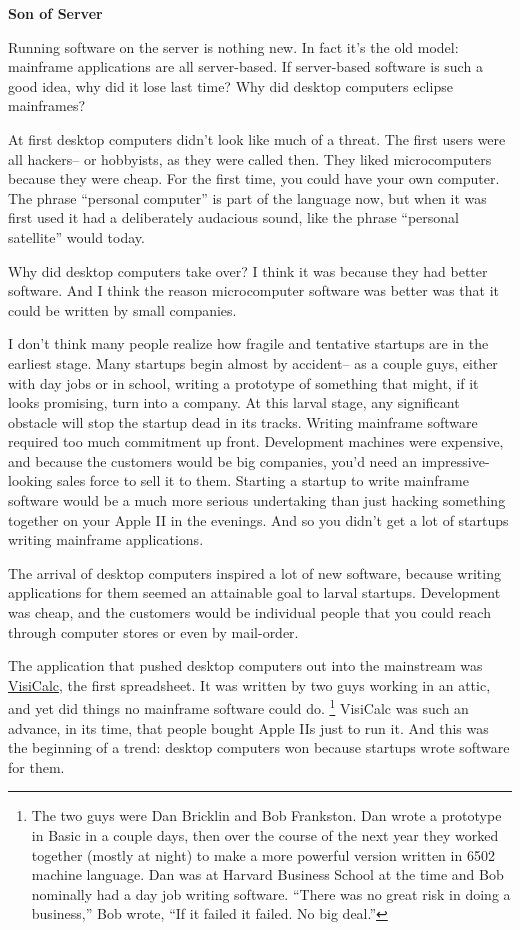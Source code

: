 \textbf{Son of Server}

Running software on the server is nothing new. In fact it's the old
model: mainframe applications are all server-based. If server-based
software is such a good idea, why did it lose last time? Why did desktop
computers eclipse mainframes?

At first desktop computers didn't look like much of a threat. The first
users were all hackers-- or hobbyists, as they were called then. They
liked microcomputers because they were cheap. For the first time, you
could have your own computer. The phrase ``personal computer'' is part
of the language now, but when it was first used it had a deliberately
audacious sound, like the phrase ``personal satellite'' would today.

Why did desktop computers take over? I think it was because they had
better software. And I think the reason microcomputer software was
better was that it could be written by small companies.

I don't think many people realize how fragile and tentative startups are
in the earliest stage. Many startups begin almost by accident-- as a
couple guys, either with day jobs or in school, writing a prototype of
something that might, if it looks promising, turn into a company. At
this larval stage, any significant obstacle will stop the startup dead
in its tracks. Writing mainframe software required too much commitment
up front. Development machines were expensive, and because the customers
would be big companies, you'd need an impressive-looking sales force to
sell it to them. Starting a startup to write mainframe software would be
a much more serious undertaking than just hacking something together on
your Apple II in the evenings. And so you didn't get a lot of startups
writing mainframe applications.

The arrival of desktop computers inspired a lot of new software, because
writing applications for them seemed an attainable goal to larval
startups. Development was cheap, and the customers would be individual
people that you could reach through computer stores or even by
mail-order.

The application that pushed desktop computers out into the mainstream
was \href{http://www.bricklin.com/visicalc.htm}{VisiCalc}, the first
spreadsheet. It was written by two guys working in an attic, and yet did
things no mainframe software could do. \footnote{The two guys were Dan Bricklin and Bob Frankston. Dan wrote a
prototype in Basic in a couple days, then over the course of the next
year they worked together (mostly at night) to make a more powerful
version written in 6502 machine language. Dan was at Harvard Business
School at the time and Bob nominally had a day job writing software.
``There was no great risk in doing a business,'' Bob wrote, ``If it
failed it failed. No big deal.''} VisiCalc was such an
advance, in its time, that people bought Apple IIs just to run it. And
this was the beginning of a trend: desktop computers won because
startups wrote software for them.

